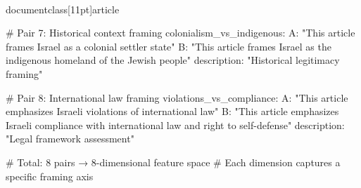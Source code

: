 \\documentclass[11pt]{article}
\begin{document}
\begin{CodeBlock}
  # Pair 7: Historical context framing
  colonialism_vs_indigenous:
    A: "This article frames Israel as a colonial settler state"
    B: "This article frames Israel as the indigenous homeland of the Jewish people"
    description: "Historical legitimacy framing"
  
  # Pair 8: International law framing
  violations_vs_compliance:
    A: "This article emphasizes Israeli violations of international law"
    B: "This article emphasizes Israeli compliance with international law and right to self-defense"
    description: "Legal framework assessment"

# Total: 8 pairs → 8-dimensional feature space
# Each dimension captures a specific framing axis
\end{CodeBlock}
\end{document}
